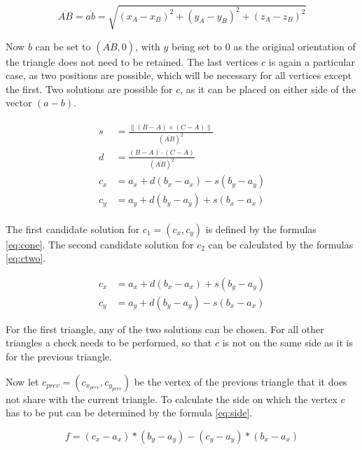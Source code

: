 \documentclass[draft,final]{vutinfth} %
\begin{document}
\begin{equation}
\label{eq:pytha}
\overline{AB} = \overline{ab} = \sqrt{(x_A - x_B)^2 + (y_A - y_B)^2 + (z_A - z_B)^2}
\end{equation}

Now $b$ can be set to $(\overline{AB}, 0)$, with $y$ being set to $0$ as the original orientation of the triangle does not need to be retained. The last vertices $c$ is again a particular case, as two positions are possible, which will be necessary for all vertices except the first. Two solutions are possible for $c$, as it can be placed on either side of the vector $(a-b)$. 

\begin{align}
\label{eq:cone}
\begin{split}
s &= \frac{\|(B - A)\times(C - A)\|}{(\overline{AB})^2}\\
d &= \frac{(B-A)\cdot(C-A)}{(\overline{AB})^2}\\
c_x &= a_x + d(b_x - a_x) - s(b_y - a_y)\\
c_y &= a_y + d(b_y - a_y) + s(b_x - a_x)
\end{split}
\end{align}

The first candidate solution for $c_1 = (c_x, c_y)$ is defined by the formulas \ref{eq:cone}. The second candidate solution for $c_2$ can be calculated by the formulas \ref{eq:ctwo}. 

\begin{equation}
\label{eq:ctwo}
\begin{split}
c_x &= a_x + d(b_x - a_x) + s(b_y - a_y)\\
c_y &= a_y + d(b_y - a_y) - s(b_x - a_x)
\end{split}
\end{equation}

For the first triangle, any of the two solutions can be chosen. For all other triangles a check needs to be performed, so that $c$ is not on the same side as it is for the previous triangle.


Now let $c_{prev} = (c_{x_{prev}},c_{y_{prev}})$ be the vertex of the previous triangle that it does not share with the current triangle. To calculate the side on which the vertex $c$ has to be put can be determined by the formula \ref{eq:side}.

\begin{equation}
\label{eq:side}
f = (c_x - a_x) * (b_y - a_y) - (c_y - a_y) * (b_x - a_x)
\end{equation}
\end{document}
